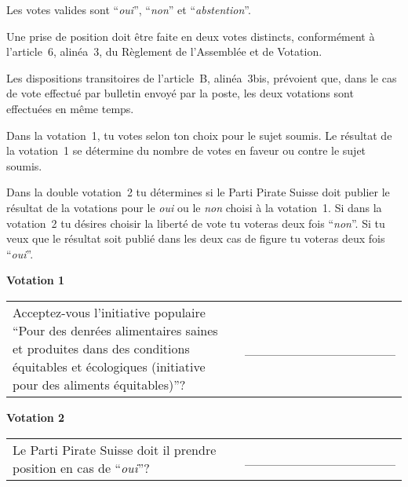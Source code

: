 \documentclass[11pt, a4paper]{scrartcl}
\newcommand{\oui}{\enquote{\textit{oui}}}
\newcommand{\non}{\enquote{\textit{non}}}
\newcommand{\abstention}{\enquote{\textit{abstention}}}
\begin{document}
{\begin{minipage}[t][12.5cm][t]{17.7cm}
\vspace{0.2cm}
Les votes valides sont \oui{}, \non{} et \abstention{}.

\vspace{0.2cm}
Une prise de position doit être faite en deux votes distincts, conformément à l'article~6, alinéa~3, du Règlement de l'Assemblée et de Votation.

\vspace{0.2cm}
Les dispositions transitoires de l'article~B, alinéa~3bis, prévoient que, dans le cas de vote effectué par bulletin envoyé par la poste, les deux votations sont effectuées en même temps.

\vspace{0.2cm}
Dans la votation~1, tu votes selon ton choix pour le sujet soumis. Le résultat de la votation~1 se détermine du nombre de votes en faveur ou contre le sujet soumis.

\vspace{0.2cm}
Dans la double votation~2 tu détermines si le Parti Pirate Suisse doit publier le résultat de la votations pour le \textit{oui} ou le \textit{non} choisi à la votation~1. Si dans la votation~2 tu désires choisir la liberté de vote tu voteras deux fois \non{}. Si tu veux que le résultat soit publié dans les deux cas de figure tu voteras deux fois \oui{}.

\vspace{1cm}

\textbf{Votation 1}

\vspace{0.5cm}

\begin{tabular}{ b{13.5cm} b{3cm} }
Acceptez-vous l'initiative populaire \enquote{Pour des denrées alimentaires saines et produites dans des conditions équitables et écologiques (initiative pour des aliments équitables)}?
& \_\_\_\_\_\_\_\_\_\_\_\_\_\_\_\_ \\
\end{tabular}

\vspace{0.5cm}

\textbf{Votation 2}

\vspace{0.5cm}

\begin{tabular}{ b{13.5cm} b{3cm} }
Le Parti Pirate Suisse doit il prendre position en cas de \oui{}?
& \_\_\_\_\_\_\_\_\_\_\_\_\_\_\_\_ \\
\end{tabular}


\end{minipage}}
\end{document}
